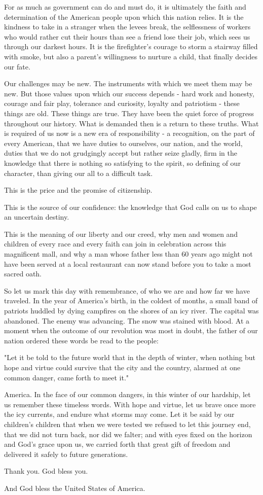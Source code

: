 {For as much as government can do and must do, it is ultimately the faith and determination of the American people upon which this nation relies. It is the kindness to take in a stranger when the levees break, the selflessness of workers who would rather cut their hours than see a friend lose their job, which sees us through our darkest hours. It is the firefighter's courage to storm a stairway filled with smoke, but also a parent's willingness to nurture a child, that finally decides our fate.

Our challenges may be new. The instruments with which we meet them may be new. But those values upon which our success depends - hard work and honesty, courage and fair play, tolerance and curiosity, loyalty and patriotism - these things are old. These things are true. They have been the quiet force of progress throughout our history. What is demanded then is a return to these truths. What is required of us now is a new era of responsibility - a recognition, on the part of every American, that we have duties to ourselves, our nation, and the world, duties that we do not grudgingly accept but rather seize gladly, firm in the knowledge that there is nothing so satisfying to the spirit, so defining of our character, than giving our all to a difficult task.

This is the price and the promise of citizenship.

This is the source of our confidence: the knowledge that God calls on us to shape an uncertain destiny.

This is the meaning of our liberty and our creed, why men and women and children of every race and every faith can join in celebration across this magnificent mall, and why a man whose father less than 60 years ago might not have been served at a local restaurant can now stand before you to take a most sacred oath.

So let us mark this day with remembrance, of who we are and how far we have traveled. In the year of America's birth, in the coldest of months, a small band of patriots huddled by dying campfires on the shores of an icy river. The capital was abandoned. The enemy was advancing. The snow was stained with blood. At a moment when the outcome of our revolution was most in doubt, the father of our nation ordered these words be read to the people:

"Let it be told to the future world that in the depth of winter, when nothing but hope and virtue could survive that the city and the country, alarmed at one common danger, came forth to meet it."

America. In the face of our common dangers, in this winter of our hardship, let us remember these timeless words. With hope and virtue, let us brave once more the icy currents, and endure what storms may come. Let it be said by our children's children that when we were tested we refused to let this journey end, that we did not turn back, nor did we falter; and with eyes fixed on the horizon and God's grace upon us, we carried forth that great gift of freedom and delivered it safely to future generations.

Thank you. God bless you.

And God bless the United States of America.
}